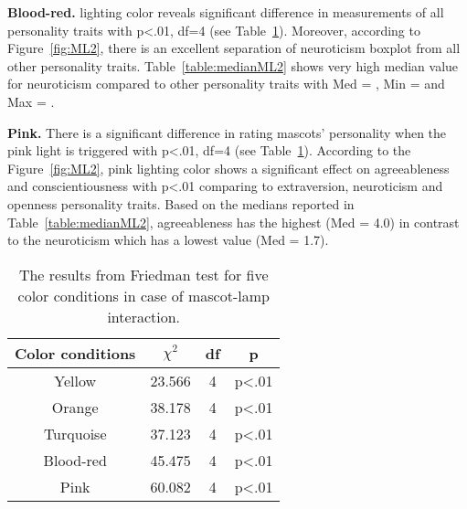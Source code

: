 \par\textbf{Blood-red.}
lighting color reveals significant difference in measurements of all personality traits
with p<.01, df=4 (see Table~\ref{table:friedmanML2}).
Moreover, according to Figure~\ref{fig:ML2}, there is an excellent separation of neuroticism boxplot from all other personality traits.
Table~\ref{table:medianML2} shows very high median value for neuroticism compared to other
personality traits with Med = , Min = and Max = .

\par\textbf{Pink.}
There is a significant difference in rating mascots' personality when the pink light is
triggered with p<.01, df=4 (see Table~\ref{table:friedmanML2}).
According to the Figure~\ref{fig:ML2}, pink lighting color shows a significant effect on agreeableness
and conscientiousness with p<.01 comparing to extraversion, neuroticism and openness personality traits.
Based on the medians reported in Table~\ref{table:medianML2}, agreeableness has the
highest (Med = 4.0) in contrast to the neuroticism which has a lowest value (Med = 1.7).

\begin{table}[!htb]
    \renewcommand{\arraystretch}{1}
    \begin{center}
        \begin{tabular}{|c|c|c|c|}
            \hline
            \textbf{Color conditions} & \textbf{$\chi^2$} & \textbf{df} & \textbf{p} \\
            \hline
            Yellow &23.566 &4 &p<.01 \\
            \hline
            Orange &38.178 &4 &p<.01\\
            \hline
            Turquoise &37.123 &4 &p<.01 \\
            \hline
            Blood-red &45.475 &4 &p<.01 \\
            \hline
            Pink &60.082 &4 &p<.01 \\
            \hline
        \end{tabular}
        \caption{The results from Friedman test for five color conditions in case of mascot-lamp interaction.}
        \label{table:friedmanML2}
    \end{center}
\end{table}

